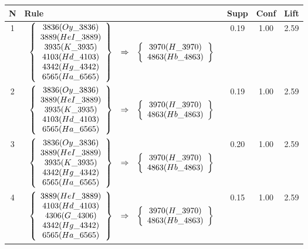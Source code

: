 \begin{longtable}{| c | l | c | c | c |}
\hline
\textbf{N} & \textbf{Rule} & \textbf{Supp} & \textbf{Conf} & \textbf{Lift} \\ \hline
1 & $\begin{array}{c c c}\left\{\begin{array}{c}3836 (Oy\_3836) \\ 3889 (HeI\_3889) \\ 3935 (K\_3935) \\ 4103 (Hd\_4103) \\ 4342 (Hg\_4342) \\ 6565 (Ha\_6565)\end{array}\right\} & \Rightarrow & \left\{\begin{array}{c}3970 (H\_3970) \\ 4863 (Hb\_4863)\end{array}\right\}\end{array}$ & 0.19 & 1.00 & 2.59 \\ \hline
2 & $\begin{array}{c c c}\left\{\begin{array}{c}3836 (Oy\_3836) \\ 3889 (HeI\_3889) \\ 3935 (K\_3935) \\ 4103 (Hd\_4103) \\ 6565 (Ha\_6565)\end{array}\right\} & \Rightarrow & \left\{\begin{array}{c}3970 (H\_3970) \\ 4863 (Hb\_4863)\end{array}\right\}\end{array}$ & 0.19 & 1.00 & 2.59 \\ \hline
3 & $\begin{array}{c c c}\left\{\begin{array}{c}3836 (Oy\_3836) \\ 3889 (HeI\_3889) \\ 3935 (K\_3935) \\ 4342 (Hg\_4342) \\ 6565 (Ha\_6565)\end{array}\right\} & \Rightarrow & \left\{\begin{array}{c}3970 (H\_3970) \\ 4863 (Hb\_4863)\end{array}\right\}\end{array}$ & 0.20 & 1.00 & 2.59 \\ \hline
4 & $\begin{array}{c c c}\left\{\begin{array}{c}3889 (HeI\_3889) \\ 4103 (Hd\_4103) \\ 4306 (G\_4306) \\ 4342 (Hg\_4342) \\ 6565 (Ha\_6565)\end{array}\right\} & \Rightarrow & \left\{\begin{array}{c}3970 (H\_3970) \\ 4863 (Hb\_4863)\end{array}\right\}\end{array}$ & 0.15 & 1.00 & 2.59 \\ \hline

\end{longtable}

